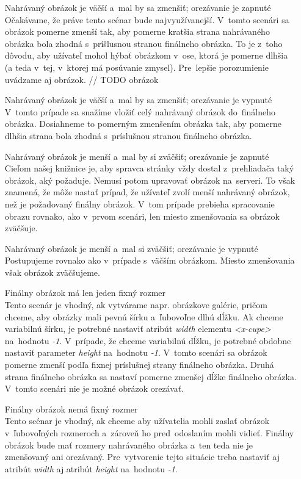 \begin{itemize}
	\item[Nahrávaný obrázok je väčší a~mal by sa zmenšiť; orezávanie je zapnuté] \hfill \\
	Očakávame, že práve tento scénar bude najvyužívanejší. V~tomto scenári sa obrázok pomerne zmenší tak, aby pomerne kratšia strana nahrávaného obrázka bola zhodná s~príšlusnou stranou finálneho obrázka. To je z~toho dôvodu, aby užívateľ mohol hýbať obrázkom v~ose, ktorá je pomerne dlhšia (a teda v~tej, v~ktorej má posúvanie zmysel). Pre~lepšie porozumienie uvádzame aj obrázok. // TODO obrázok
	\item[Nahrávaný obrázok je väčší a~mal by sa zmenšiť; orezávanie je vypnuté] \hfill \\
	V~tomto prípade sa snažíme vložiť celý nahrávaný obrázok do~finálneho obrázka. Dosiahneme to pomerným zmenšením obrázka tak, aby pomerne dlhšia strana bola zhodná s~príslušnou stranou finálneho obrázka.
	\item[Nahrávaný obrázok je menší a~mal by si zväčšiť; orezávanie je zapnuté] \hfill \\
	Cieľom našej knižnice je, aby spravca stránky vždy dostal z~prehliadača taký obrázok, aký požaduje. Nemusí potom upravovať obrázok na~serveri. To však znamená, že môže nastať prípad, že užívateľ zvolí menší nahrávaný obrázok, než je požadovaný finálny obrázok. V~tom prípade prebieha spracovanie obrazu rovnako, ako v~prvom scenári, len miesto zmenšovania sa obrázok zväčšuje.
	\item[Nahrávaný obrázok je menší a~mal si zväčšiť; orezávanie je vypnuté] \hfill \\
	Postupujeme rovnako ako v~prípade s~väčším obrázkom. Miesto zmenšovania však obrázok zväčšujeme.
	\item[Finálny obrázok má len jeden fixný rozmer] \hfill \\
	Tento scenár je vhodný, ak vytvárame napr. obrázkove galérie, pričom chceme, aby obrázky mali pevnú šírku a~ľubovoľne dlhú dĺžku. Ak chceme variabilnú šírku, je potrebné nastaviť atribút \emph{width} elementu \emph{<x-cupe>} na~hodnotu \emph{-1}. V~prípade, že chceme variabilnú dĺžku, je potrebné obdobne nastaviť parameter \emph{height} na~hodnotu \emph{-1}. V~tomto scenári sa obrázok pomerne zmenší podľa fixnej príslušnej strany finálneho obrázka. Druhá strana finálneho obrázka sa nastaví pomerne zmenšej dĺžke finálneho obrázka. V~tomto scenári nie je možné obrázok orezávať.
	\item[Finálny obrázok nemá fixný rozmer] \hfill \\
	Tento scénar je vhodný, ak chceme aby užívatelia mohli zaslať obrázok v~ľubovoľných rozmeroch a~zároveň ho pred~odoslaním mohli vidieť. Finálny obrázok bude mať rozmery nahrávaného obrázka a~ten teda nie je zmenšovaný ani orezávaný. Pre~vytvorenie tejto situácie treba nastaviť aj atribút \emph{width} aj atribút \emph{height} na~hodnotu \emph{-1}.
	
\end{itemize}


